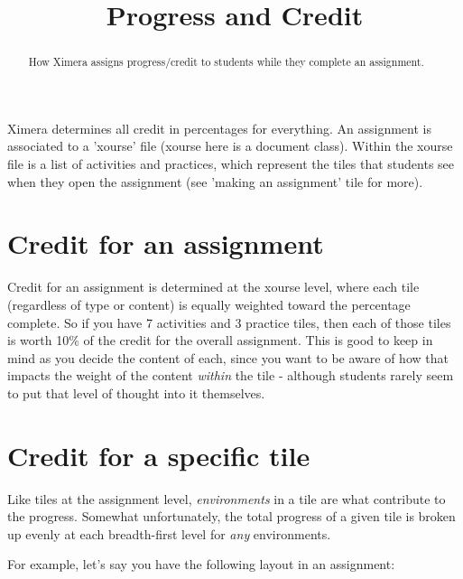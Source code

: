 \documentclass{ximera}
\title{Progress and Credit}
\begin{document}
\begin{abstract}
    How Ximera assigns progress/credit to students while they complete an assignment.
\end{abstract}
\maketitle

    Ximera determines all credit in percentages for everything. An assignment is associated to a 'xourse' file (xourse here is a document class). Within the xourse file is a list of activities and practices, which represent the tiles that students see when they open the assignment (see 'making an assignment' tile for more).
    
    \section{Credit for an assignment}
        Credit for an assignment is determined at the xourse level, where each tile (regardless of type or content) is equally weighted toward the percentage complete. So if you have 7 activities and 3 practice tiles, then each of those tiles is worth 10\% of the credit for the overall assignment. This is good to keep in mind as you decide the content of each, since you want to be aware of how that impacts the weight of the content \textit{within} the tile - although students rarely seem to put that level of thought into it themselves.
        
    \section{Credit for a specific tile}
        Like tiles at the assignment level, \textit{environments} in a tile are what contribute to the progress. Somewhat unfortunately, the total progress of a given tile is broken up evenly at each breadth-first level for \textit{any} environments. 
        
        For example, let's say you have the following layout in an assignment:
        
\end{document}
